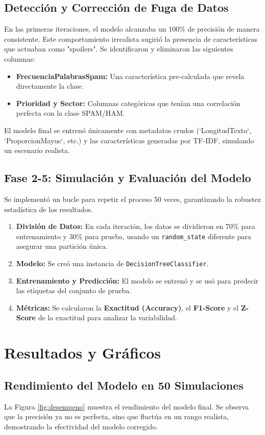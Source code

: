 \documentclass[12pt, a4paper]{article}
\begin{document}
\subsection{Detección y Corrección de Fuga de Datos}
En las primeras iteraciones, el modelo alcanzaba un 100\% de precisión de manera consistente. Este comportamiento irrealista sugirió la presencia de características que actuaban como "spoilers". Se identificaron y eliminaron las siguientes columnas:
\begin{itemize}
    \item \textbf{FrecuenciaPalabrasSpam:} Una característica pre-calculada que revela directamente la clase.
    \item \textbf{Prioridad y Sector:} Columnas categóricas que tenían una correlación perfecta con la clase SPAM/HAM.
\end{itemize}
El modelo final se entrenó únicamente con metadatos crudos (`LongitudTexto`, `ProporcionMayus`, etc.) y las características generadas por TF-IDF, simulando un escenario realista.

\subsection{Fase 2-5: Simulación y Evaluación del Modelo}
Se implementó un bucle para repetir el proceso 50 veces, garantizando la robustez estadística de los resultados.
\begin{enumerate}
    \item \textbf{División de Datos:} En cada iteración, los datos se dividieron en 70\% para entrenamiento y 30\% para prueba, usando un \texttt{random\_state} diferente para asegurar una partición única.
    \item \textbf{Modelo:} Se creó una instancia de \texttt{DecisionTreeClassifier}.
    \item \textbf{Entrenamiento y Predicción:} El modelo se entrenó y se usó para predecir las etiquetas del conjunto de prueba.
    \item \textbf{Métricas:} Se calcularon la \textbf{Exactitud (Accuracy)}, el \textbf{F1-Score} y el \textbf{Z-Score} de la exactitud para analizar la variabilidad.
\end{enumerate}

\section{Resultados y Gráficos}

\subsection{Rendimiento del Modelo en 50 Simulaciones}
La Figura \ref{fig:desempeno} muestra el rendimiento del modelo final. Se observa que la precisión ya no es perfecta, sino que fluctúa en un rango realista, demostrando la efectividad del modelo corregido.
\end{document}
